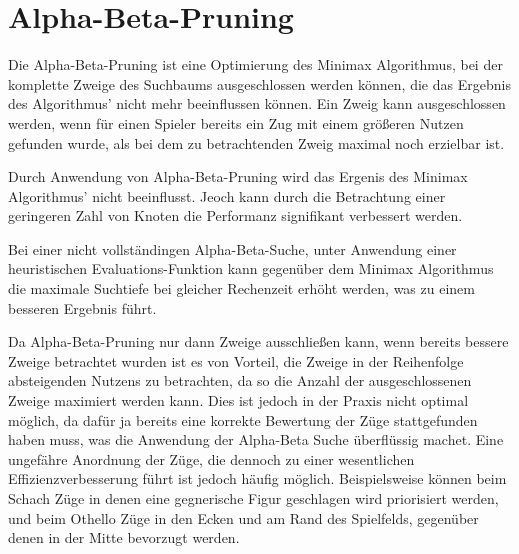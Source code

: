 \section{Alpha-Beta-Pruning}

Die Alpha-Beta-Pruning ist eine Optimierung des Minimax Algorithmus, bei der komplette Zweige des Suchbaums ausgeschlossen werden können, die das Ergebnis des Algorithmus' nicht mehr beeinflussen können.
Ein Zweig kann ausgeschlossen werden, wenn für einen Spieler bereits ein Zug mit einem größeren Nutzen gefunden wurde, als bei dem zu betrachtenden Zweig maximal noch erzielbar ist.

Durch Anwendung von Alpha-Beta-Pruning wird das Ergenis des Minimax Algorithmus' nicht beeinflusst. Jeoch kann durch die Betrachtung einer geringeren Zahl von Knoten die Performanz signifikant verbessert werden.

Bei einer nicht vollständingen Alpha-Beta-Suche, unter Anwendung einer heuristischen Evaluations-Funktion kann gegenüber dem Minimax Algorithmus die maximale Suchtiefe bei gleicher Rechenzeit erhöht werden, was zu einem besseren Ergebnis führt.

Da Alpha-Beta-Pruning nur dann Zweige ausschließen kann, wenn bereits bessere Zweige betrachtet wurden ist es von Vorteil, die Zweige in der Reihenfolge absteigenden Nutzens zu betrachten, da so die Anzahl der ausgeschlossenen
Zweige maximiert werden kann.
Dies ist jedoch in der Praxis nicht optimal möglich, da dafür ja bereits eine korrekte Bewertung der Züge stattgefunden haben muss, was die Anwendung der Alpha-Beta Suche überflüssig machet.
Eine ungefähre Anordnung der Züge, die dennoch zu einer wesentlichen Effizienzverbesserung führt ist jedoch häufig möglich. Beispielsweise können beim Schach Züge in denen eine gegnerische Figur
geschlagen wird priorisiert werden, und beim Othello Züge in den Ecken und am Rand des Spielfelds, gegenüber denen in der Mitte bevorzugt werden.